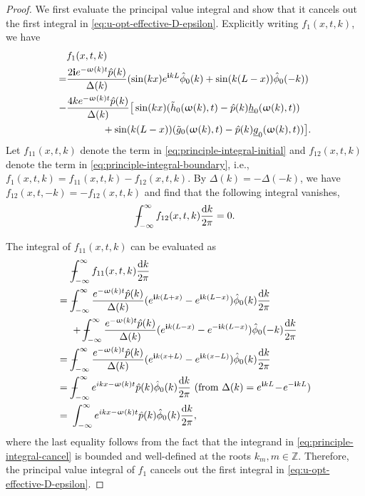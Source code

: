 \documentclass[journal,twoside,web]{ieeecolor}
\newcommand{\ZZ}{\mathbb{Z}}
\newcommand{\state}{\phi}
\newcommand{\statehat}{\hat{\state}}
\newcommand{\im}{\mathbf{i}}
\newcommand*\diff{\mathop{}\!\mathrm{d}}
\newcommand{\wcomplex}{\upomega}
\def\Xint#1{\mathchoice
	{\XXint\displaystyle\textstyle{#1}}%
	{\XXint\textstyle\scriptstyle{#1}}%
	{\XXint\scriptstyle\scriptscriptstyle{#1}}%
	{\XXint\scriptscriptstyle\scriptscriptstyle{#1}}%
	\!\int}
\def\XXint#1#2#3{{\setbox0=\hbox{$#1{#2#3}{\int}$}
		\vcenter{\hbox{$#2#3$}}\kern-.5\wd0}}
\def\dashint{\Xint-}
\begin{document}
\begin{proof}
We first evaluate the principal value integral and show that it cancels out the first integral in \eqref{eq:u-opt-effective-D-epsilon}.
Explicitly writing $f_1(x,t,k)$, we have
\begin{align}
		&f_1(x,t,k) \nonumber
		\\ =& \dfrac{2\im e^{-\wcomplex(k)t}\hat{p}(k)}{\Delta(k)}(\sin(kx)e^{\im k L}\statehat_0(k) + \sin(k(L-x)) \statehat_0(-k)) \label{eq:principle-integral-initial}\\ 
		-&\dfrac{4ke^{-\wcomplex(k)t}\hat{p}(k)}{\Delta(k)}\big[\sin(kx)(\tilde{h}_0(\wcomplex(k),t) - \hat{p}(k)\underline{h}_0(\wcomplex(k),t))\nonumber \\
		&\hspace{0.5in} +\sin(k(L-x))(\tilde{g}_0(\wcomplex(k),t) - \hat{p}(k)\underline{g}_0(\wcomplex(k),t)) \big]. \label{eq:principle-integral-boundary}
\end{align} 
Let $f_{11}(x,t,k)$ denote the term in \eqref{eq:principle-integral-initial} and $f_{12}(x,t,k)$ denote the term in \eqref{eq:principle-integral-boundary}, i.e., $f_1(x,t,k) = f_{11}(x,t,k) - f_{12}(x,t,k)$.
By $\Delta(k) = -\Delta(-k)$, we have $f_{12}(x,t,-k) = -f_{12}(x,t,k)$ and find that the following integral vanishes,
 $$\dashint_{-\infty}^{\infty}f_{12}(x,t,k)\dfrac{\diff k}{2\pi}=0.$$
 
The integral of $f_{11}(x,t,k)$ can be evaluated as
\begin{equation*}
	\begin{aligned}
		&\dashint_{-\infty}^{\infty}f_{11}(x,t,k)\dfrac{\diff k}{2\pi} \\
		=\ &\dashint_{-\infty}^{\infty}\dfrac{e^{-\wcomplex(k)t}\hat{p}(k)}{\Delta(k)}(e^{\im k (L + x)} - e^{\im k (L - x)})\statehat_0(k)\dfrac{\diff k}{2\pi} \\
		&+\dashint_{-\infty}^{\infty}\dfrac{e^{-\wcomplex(k)t}\hat{p}(k)}{\Delta(k)}(e^{\im k(L - x)} - e^{-\im k(L - x)})\statehat_0(-k)\dfrac{\diff k}{2\pi}\\
		=\ &\dashint_{-\infty}^{\infty}\dfrac{e^{-\wcomplex(k)t}\hat{p}(k)}{\Delta(k)}(e^{\im k (x + L)} - e^{\im k (x-L)})\statehat_0(k)\dfrac{\diff k}{2\pi}\nonumber \\
		=\ &\dashint_{-\infty}^{\infty}e^{ikx-\wcomplex(k)t}\hat{p}(k)\statehat_0(k)\dfrac{\diff k}{2\pi}\ (\text{from } \Delta(k) = e^{\im k L}\! -\! e^{- \im k L}) \nonumber \\
		=\ &\int_{-\infty}^{\infty}e^{ikx-\wcomplex(k)t}\hat{p}(k)\statehat_0(k)\dfrac{\diff k}{2\pi}, \label{eq:principle-integral-cancel}
\end{aligned}	
\end{equation*}
where the last equality follows from the fact that the integrand in \eqref{eq:principle-integral-cancel} is bounded and well-defined at the roots $k_m,m\in\ZZ$. 
Therefore, the principal value integral of $f_1$ cancels out the first integral in \eqref{eq:u-opt-effective-D-epsilon}.


\end{proof}
\end{document}
